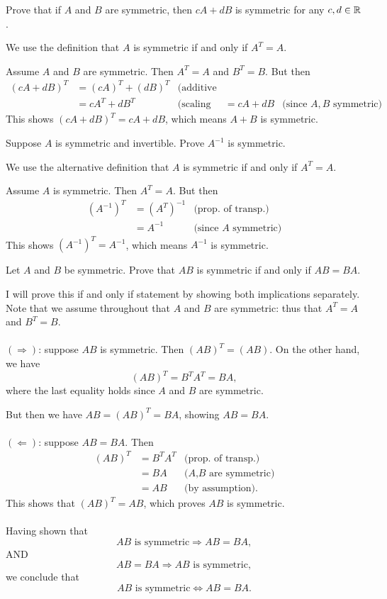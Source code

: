\ii Prove that if $A$ and $B$ are symmetric, then $cA+dB$ is symmetric for any $c,d\in{\mathbb R}$. 
\\
\begin{solution}
We use the definition that $A$ is symmetric if and only if $A^T=A$.

Assume $A$ and $B$ are symmetric. Then $A^T=A$ and $B^T=B$. But then 
\begin{align*}
(cA+dB)^T&=(cA)^T+(dB)^T &\text{(additive prop. of transp.)}\\
&=cA^T+dB^T &\text{(scaling prop. of transp.}
&=cA+dB &\text{(since $A,B$ symmetric)}
\end{align*}
This shows $(cA+dB)^T=cA+dB$, which means $A+B$ is symmetric. 
\end{solution}
\ii Suppose $A$ is symmetric and invertible. Prove $A^{-1}$ is symmetric.
\\
\begin{solution}
\noindent We use the alternative definition that $A$ is symmetric if and only if $A^T=A$.

Assume $A$ is symmetric. Then $A^T=A$. But then 
\begin{align*}
(A^{-1})^T&=(A^T)^{-1} &\text{(prop. of transp.)}\\
&=A^{-1} &\text{(since $A$ symmetric)}
\end{align*}
This shows $(A^{-1})^T=A^{-1}$, which means $A^{-1}$ is symmetric. 
\end{solution}
\ii Let $A$ and $B$ be symmetric. Prove that $AB$ is symmetric if and only if $AB=BA$.
\\
\begin{solution}
I will prove this if and only if statement by showing both implications separately. Note that we assume throughout that $A$ and $B$ are symmetric: thus that $A^T=A$ and $B^T=B$.  
\\ \\
$(\Rightarrow)$: suppose $AB$ is symmetric. Then $(AB)^T=(AB)$. On the other hand, we have 
\[
(AB)^T=B^TA^T=BA, 
\] 
where the last equality holds since $A$ and $B$ are symmetric. 

But then we have $AB=(AB)^T=BA$, showing $AB=BA$. 
\\ \\
$(\Leftarrow)$: suppose $AB=BA$. Then 
\begin{align*}
(AB)^T&=B^TA^T &\text{(prop. of transp.)}\\
&=BA &\text{($A$,$B$ are symmetric)}\\
&=AB &\text{(by assumption)}.
\end{align*}
This shows that $(AB)^T=AB$, which proves $AB$ is symmetric. 
\\ \\ 
Having shown that 
\[
\text{$AB$ is symmetric}\Rightarrow AB=BA,
\]
AND 
\[
AB=BA\Rightarrow \text{$AB$ is symmetric},
\]
we conclude that 
\[
\text{$AB$ is symmetric}\Leftrightarrow AB=BA.
\]
\end{solution}


